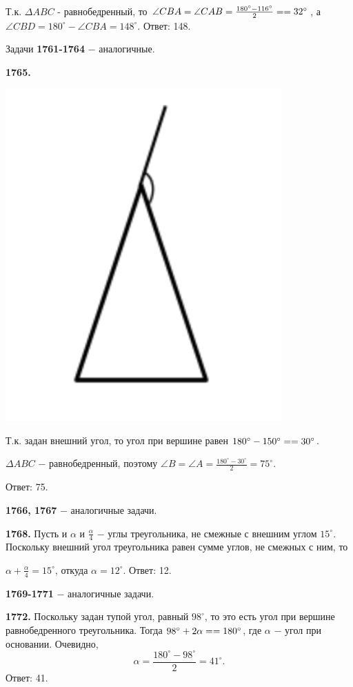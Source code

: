 Т.к. $\Delta ABC$ - равнобедренный, то $\angle CBA = \angle CAB = \frac{180^\circ - 116^\circ}{2} = \linebreak =32^\circ$, а $\angle CBD = 180^\circ - \angle CBA = 148^\circ.$ \newline \null \hspace*{\fill} Ответ: 148.

Задачи \textbf{1761-1764} $-$ аналогичные.

\textbf{1765.}

{\centering \includegraphics[width=0.3\linewidth]{Geometry/Content/6.png}

}

Т.к. задан внешний угол, то угол при вершине равен $180^\circ - 150^\circ = \linebreak
=30^\circ$.

$\Delta ABC$ $-$ равнобедренный, поэтому $\angle B = \angle A = \frac{180^\circ - 30^\circ}{2} = 75^\circ$.

\null \hspace*{\fill} Ответ: 75.

\textbf{1766, 1767} $-$ аналогичные задачи.

\textbf{1768.} Пусть и $\alpha$ и $\frac{\alpha}{4}$ $-$ углы треугольника, не смежные с внешним углом $15^\circ$. Поскольку внешний угол треугольника равен сумме углов, не смежных с ним, то

{\centering $\alpha + \frac{\alpha}{4} = 15^\circ$, откуда $\alpha =12^\circ$. \newline \null \hspace*{\fill} Ответ: 12.

}

\textbf{1769-1771} $-$ аналогичные задачи.

\textbf{1772.}  Поскольку задан тупой угол, равный $98^\circ$, то это есть угол при вершине равнобедренного треугольника. Тогда  $98^\circ + 2\alpha = \linebreak= 180^\circ$, где $\alpha$ $-$ угол при основании. Очевидно, 
\[
\alpha = \frac{180^\circ - 98^\circ}{2} = 41^\circ.
\]\null \hspace*{\fill} Ответ: 41.

